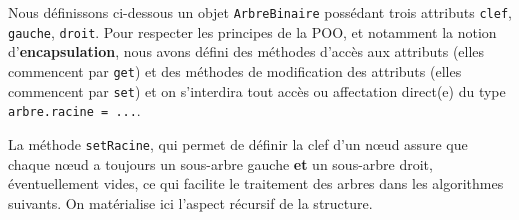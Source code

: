 \documentclass[
  a4paper,
  DIV=11,
  numbers=noendperiod]{scrartcl}
\begin{document}
Nous définissons ci-dessous un objet \texttt{ArbreBinaire} possédant
trois attributs \texttt{clef}, \texttt{gauche}, \texttt{droit}. Pour
respecter les principes de la POO, et notamment la notion
d'\textbf{encapsulation}, nous avons défini des méthodes d'accès aux
attributs (elles commencent par \texttt{get}) et des méthodes de
modification des attributs (elles commencent par \texttt{set}) et on
s'interdira tout accès ou affectation direct(e) du type
\texttt{arbre.racine\ =\ ...}.

La méthode \texttt{setRacine}, qui permet de définir la clef d'un nœud
assure que chaque nœud a toujours un sous-arbre gauche \textbf{et} un
sous-arbre droit, éventuellement vides, ce qui facilite le traitement
des arbres dans les algorithmes suivants. On matérialise ici l'aspect
récursif de la structure.
\end{document}
